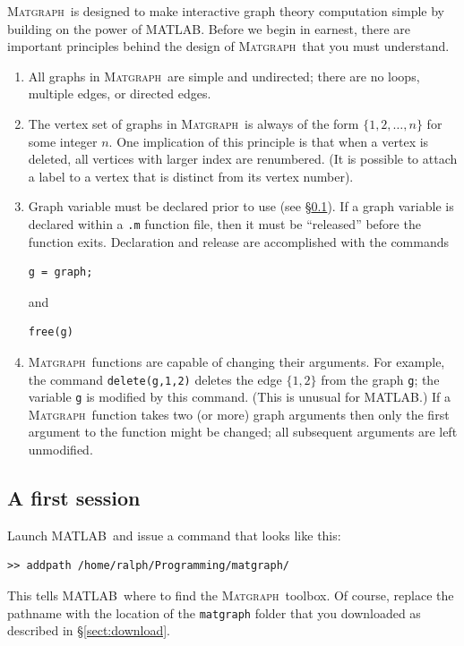 \documentclass[12pt]{amsart}
\newcommand\matlab{MATLAB}
\newcommand\matgraph{\textsc{Matgraph}}
\begin{document}
\matgraph\ is designed to make interactive graph theory computation
simple by building on the power of \matlab. Before we begin in
earnest, there are  important principles behind the design of
\matgraph\ that you must understand.
\begin{enumerate}
\item All graphs in \matgraph\ are simple and undirected; there are no
  loops, multiple edges, or directed edges.

\item The vertex set of  graphs in \matgraph\ is always of the form
  $\{1,2,\ldots,n\}$ for some integer $n$. One implication of this
  principle is that when a vertex is deleted, all vertices  with
  larger index are renumbered. (It is possible to attach a 
  label to a vertex that is distinct from its vertex number).

\item Graph variable must be declared prior to use (see
  \S\ref{sect:first-session}). If a graph variable is declared within
  a \verb|.m| function file, then it must be ``released'' before the
  function exits. Declaration and release are accomplished with the
  commands
\begin{verbatim}
g = graph;
\end{verbatim}
  and
\begin{verbatim}
free(g)
\end{verbatim}

\item \matgraph\ functions are capable of changing their
  arguments. For example, the command \verb|delete(g,1,2)| deletes the
  edge $\{1,2\}$ from the graph \verb|g|; the variable \verb|g| is
  modified by this command. (This is unusual for \matlab.) If a
  \matgraph\ function takes two (or more) graph arguments then only
  the first argument to the function might be changed; all subsequent
  arguments are left unmodified.
\end{enumerate}


\subsection{A first session}
\label{sect:first-session}

Launch \matlab\ and issue a command that looks like this:
\begin{verbatim}
>> addpath /home/ralph/Programming/matgraph/
\end{verbatim}
This tells \matlab\ where to find the \matgraph\ toolbox. Of course,
replace the pathname with the location of the \verb|matgraph| folder
that you downloaded as described in \S\ref{sect:download}. 
\end{document}
